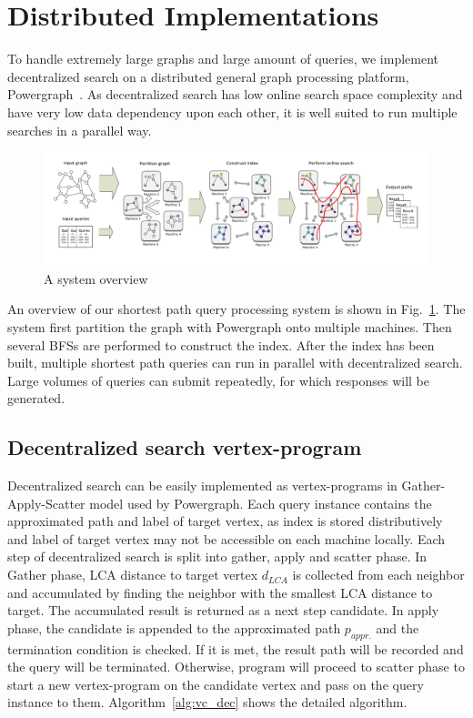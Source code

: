 \section{Distributed Implementations}
\label{implementation}

To handle extremely large graphs and large amount of queries, we implement decentralized search on a distributed general graph processing platform, Powergraph~\cite{180251}. As decentralized search has low online search space complexity and have very low data dependency upon each other, it is well suited to run multiple searches in a parallel way. 

\begin{figure}[ht]
    \centering
    \includegraphics[width=\linewidth]{./figures/new_illustrate/System.pdf}
    \caption{A system overview}
    \label{fig:system}
\end{figure}

An overview of our shortest path query processing system is shown in Fig.~\ref{fig:system}. The system first partition the graph with Powergraph onto multiple machines. Then several BFSs are performed to construct the index. After the index has been built, multiple shortest path queries can run in parallel with decentralized search. Large volumes of queries can submit repeatedly, for which responses will be generated.

\subsection{Decentralized search vertex-program}

Decentralized search can be easily implemented as vertex-programs in Gather-Apply-Scatter model used by Powergraph. Each query instance contains the approximated path and label of target vertex, as index is stored distributively and label of target vertex may not be accessible on each machine locally. Each step of decentralized search is split into gather, apply and scatter phase. In Gather phase, LCA distance to target vertex $d_{LCA}$ is collected from each neighbor and accumulated by finding the neighbor with the smallest LCA distance to target. The accumulated result is returned as a next step candidate. In apply phase, the candidate is appended to the approximated path $p_{appr.}$ and the termination condition is checked. If it is met, the result path will be recorded and the query will be terminated. Otherwise, program will proceed to scatter phase to start a new vertex-program on the candidate vertex and pass on the query instance to them. Algorithm~\ref{alg:vc_dec} shows the detailed algorithm.

